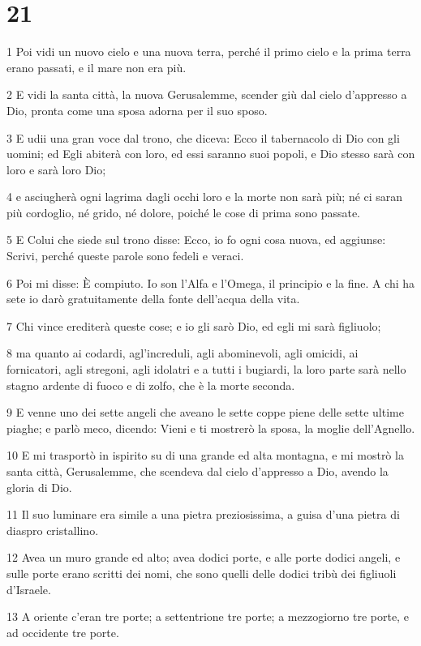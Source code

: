 \chapter{21}

\par 1 Poi vidi un nuovo cielo e una nuova terra, perché il primo cielo e la prima terra erano passati, e il mare non era più.
\par 2 E vidi la santa città, la nuova Gerusalemme, scender giù dal cielo d'appresso a Dio, pronta come una sposa adorna per il suo sposo.
\par 3 E udii una gran voce dal trono, che diceva: Ecco il tabernacolo di Dio con gli uomini; ed Egli abiterà con loro, ed essi saranno suoi popoli, e Dio stesso sarà con loro e sarà loro Dio;
\par 4 e asciugherà ogni lagrima dagli occhi loro e la morte non sarà più; né ci saran più cordoglio, né grido, né dolore, poiché le cose di prima sono passate.
\par 5 E Colui che siede sul trono disse: Ecco, io fo ogni cosa nuova, ed aggiunse: Scrivi, perché queste parole sono fedeli e veraci.
\par 6 Poi mi disse: È compiuto. Io son l'Alfa e l'Omega, il principio e la fine. A chi ha sete io darò gratuitamente della fonte dell'acqua della vita.
\par 7 Chi vince erediterà queste cose; e io gli sarò Dio, ed egli mi sarà figliuolo;
\par 8 ma quanto ai codardi, agl'increduli, agli abominevoli, agli omicidi, ai fornicatori, agli stregoni, agli idolatri e a tutti i bugiardi, la loro parte sarà nello stagno ardente di fuoco e di zolfo, che è la morte seconda.
\par 9 E venne uno dei sette angeli che aveano le sette coppe piene delle sette ultime piaghe; e parlò meco, dicendo: Vieni e ti mostrerò la sposa, la moglie dell'Agnello.
\par 10 E mi trasportò in ispirito su di una grande ed alta montagna, e mi mostrò la santa città, Gerusalemme, che scendeva dal cielo d'appresso a Dio, avendo la gloria di Dio.
\par 11 Il suo luminare era simile a una pietra preziosissima, a guisa d'una pietra di diaspro cristallino.
\par 12 Avea un muro grande ed alto; avea dodici porte, e alle porte dodici angeli, e sulle porte erano scritti dei nomi, che sono quelli delle dodici tribù dei figliuoli d'Israele.
\par 13 A oriente c'eran tre porte; a settentrione tre porte; a mezzogiorno tre porte, e ad occidente tre porte.
